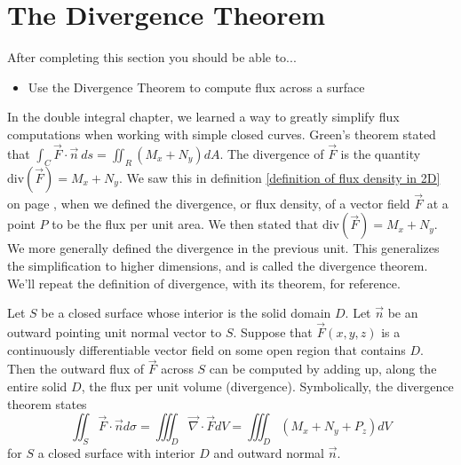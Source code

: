 
\section{The Divergence Theorem}
After completing this section you should be able to...
\begin{itemize}
\item Use the Divergence Theorem to compute flux across a surface
\end{itemize}

In the double integral chapter, we learned a way to greatly simplify flux computations when working with simple closed curves.  Green's theorem stated that $\int_C \vec F\cdot \vec n\ ds = \iint_R (M_x+N_y) dA$.  The divergence of $\vec F$ is the quantity $\text{div}(\vec F) = M_x+N_y$. We saw this in definition \ref{definition of flux density in 2D} on page \pageref{definition of flux density in 2D}, when we defined the divergence, or flux density, of a vector field $\vec F$ at a point $P$ to be the flux per unit area. We then stated that $\text{div}(\vec F)=M_x+N_y$. We more generally defined the divergence in the previous unit. This generalizes the simplification to higher dimensions, and is called the divergence theorem. We'll repeat the definition of divergence, with its theorem, for reference.

\begin{theorem}
Let $S$ be a closed surface whose interior is the solid domain $D$. Let $\vec n$ be an outward pointing unit normal vector to $S$. Suppose that $\vec F(x,y,z)$ is a continuously differentiable vector field on some open region that contains $D$. Then the outward flux of $\vec F$ across $S$ can be computed by adding up, along the entire solid $D$, the flux per unit volume (divergence).  Symbolically, the divergence theorem states
$$\iint_S\vec F\cdot \vec n d\sigma =  \iiint_D \vec \nabla \cdot \vec F dV = \iiint_D \left(M_x+N_y+P_z\right) dV $$
for $S$ a closed surface with interior $D$ and outward normal $\vec n$.
\end{theorem}

